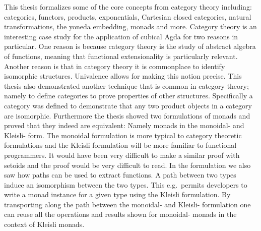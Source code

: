 This thesis formalizes some of the core concepts from category theory
including: categories, functors, products, exponentials, Cartesian
closed categories, natural transformations, the yoneda embedding,
monads and more.  Category theory is an interesting case study for the
application of cubical Agda for two reasons in particular. One reason
is because category theory is the study of abstract algebra of
functions, meaning that functional extensionality is particularly
relevant.  Another reason is that in category theory it is commonplace
to identify isomorphic structures.  Univalence allows for making this
notion precise.  This thesis also demonstrated another technique that
is common in category theory; namely to define categories to prove
properties of other structures.  Specifically a category was defined
to demonstrate that any two product objects in a category are
isomorphic.  Furthermore the thesis showed two formulations of monads
and proved that they indeed are equivalent: Namely monads in the
monoidal- and Kleisli- form.  The monoidal formulation is more typical
to category theoretic formulations and the Kleisli formulation will be
more familiar to functional programmers.  It would have been very
difficult to make a similar proof with setoids and the proof would be
very difficult to read.  In the formulation we also saw how paths can
be used to extract functions.  A path between two types induce an
isomorphism between the two types.  This e.g.\ permits developers to
write a monad instance for a given type using the Kleisli formulation.
By transporting along the path between the monoidal- and Kleisli-
formulation one can reuse all the operations and results shown for
monoidal- monads in the context of Kleisli monads.
